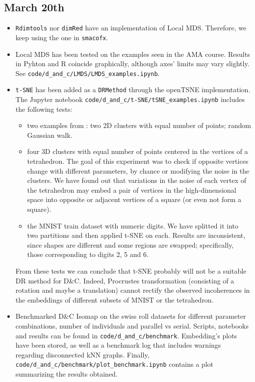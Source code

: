 \documentclass[a4paper,12pt]{article}
\begin{document}
\subsection{March 20th}
\begin{itemize}
    \item \texttt{Rdimtools} nor \texttt{dimRed} have an implementation of Local MDS. Therefore, we keep using the one in \texttt{smacofx}.
    \item Local MDS has been tested on the examples seen in the AMA course. Results in Pyhton and R coincide graphically, although axes' limits may vary slightly. See \verb|code/d_and_c/LMDS/LMDS_examples.ipynb|.
    \item \texttt{t-SNE} has been added as a \texttt{DRMethod} through the openTSNE implementation. The Jupyter notebook \verb|code/d_and_c/t-SNE/tSNE_examples.ipynb| includes the following tests:
    \begin{itemize}
        \item two examples from \cite{wattenberg2016how}: two 2D clusters with equal number of points; random Gaussian walk.
        \item four 3D clusters with equal number of points centered in the vertices of a tetrahedron. The goal of this experiment was to check if opposite vertices change with different parameters, by chance or modifying the noise in the clusters. We have found out that variations in the noise of each vertex of the tetrahedron may embed a pair of vertices in the high-dimensional space into opposite or adjacent vertices of a square (or even not form a square).
        \item the MNIST train dataset with numeric digits. We have splitted it into two partitions and then applied t-SNE on each. Results are inconsistent, since shapes are different and some regions are swapped; specifically, those corresponding to digits 2, 5 and 6.
    \end{itemize}
    From these tests we can conclude that t-SNE probably will not be a suitable DR method for D\&C. Indeed, Procrustes transformation (consisting of a rotation and maybe a translation) cannot rectify the observed incoherences in the embeddings of different subsets of MNIST or the tetrahedron.
    \item Benchmarked D\&C Isomap on the swiss roll datasets for different parameter combinations, number of individuals and parallel vs serial. Scripts, notebooks and results can be found in \verb|code/d_and_c/benchmark|. Embedding's plots have been stored, as well as a benchmark log that includes warnings regarding disconnected kNN graphs. Finally, \verb|code/d_and_c/benchmark/plot_benchmark.ipynb| contains a plot summarizing the results obtained.
\end{itemize}
\end{document}
